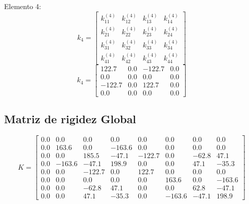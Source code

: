 \documentclass{article}%
\begin{document}
Elemento {4}:%
\[%
k_{4}= \begin{bmatrix}%
k_{11}^{(4)}&k_{12}^{(4)}&k_{13}^{(4)}&k_{14}^{(4)}\\%
k_{21}^{(4)}&k_{22}^{(4)}&k_{23}^{(4)}&k_{24}^{(4)}\\%
k_{31}^{(4)}&k_{32}^{(4)}&k_{33}^{(4)}&k_{34}^{(4)}\\%
k_{41}^{(4)}&k_{42}^{(4)}&k_{43}^{(4)}&k_{44}^{(4)}%
\end{bmatrix}%
\]%
\[%
k_{4}= \begin{bmatrix}%
122.7&0.0&-122.7&0.0\\%
0.0&0.0&0.0&0.0\\%
-122.7&0.0&122.7&0.0\\%
0.0&0.0&0.0&0.0%
\end{bmatrix}%
\]

%
\subsection{Matriz de rigidez Global}%
\label{subsec:MatrizderigidezGlobal}%
\[%
K= \begin{bmatrix}%
0.0&0.0&0.0&0.0&0.0&0.0&0.0&0.0\\%
0.0&163.6&0.0&-163.6&0.0&0.0&0.0&0.0\\%
0.0&0.0&185.5&-47.1&-122.7&0.0&-62.8&47.1\\%
0.0&-163.6&-47.1&198.9&0.0&0.0&47.1&-35.3\\%
0.0&0.0&-122.7&0.0&122.7&0.0&0.0&0.0\\%
0.0&0.0&0.0&0.0&0.0&163.6&0.0&-163.6\\%
0.0&0.0&-62.8&47.1&0.0&0.0&62.8&-47.1\\%
0.0&0.0&47.1&-35.3&0.0&-163.6&-47.1&198.9%
\end{bmatrix}%
\]

%
\end{document}
